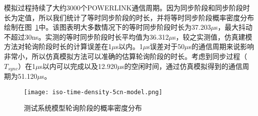 模拟过程持续了大约3000个POWERLINK通信周期。因为同步阶段和同步阶段时长为定值，所以我们统计了等时同步阶段的时长，并将等时同步阶段概率密度分布绘制在图~\ref{fig:iso-time-density-5cn-model}中。该图表明大多数情况下的等时同步阶段时长为37.203$\mu$s，最大抖动不超过30ns。实测的等时同步阶段时长平均值为36.312$\mu$s，较之实测值，仿真建模方法对轮询阶段时长的计算误差在1$\mu$s以内。1$\mu$s误差对于50$\mu$s的通信周期来说影响非常小，所以仿真模拟方法可以准确的估算轮询阶段的时长。考虑到同步过程（$T_{sync}$）在1$\mu$s以内可以完成以及12.920$\mu$s的空闲时间，通过仿真模拟得到的通信周期为51.120$\mu$s。

\begin{figure}[!htb]
  \centering
  \texttt{[image: iso-time-density-5cn-model.png]}
  \caption{测试系统模型轮询阶段的概率密度分布}
  \label{fig:iso-time-density-5cn-model}
\end{figure}







